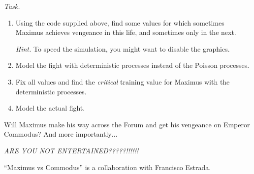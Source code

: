 \hfill

\emph{Task. } 
\begin{enumerate}[label=\emph{\arabic*.}]
	\item Using the code supplied above, find some values for which sometimes Maximus achieves vengeance in this life, and sometimes only in the next.
	
	\emph{Hint.} To speed the simulation, you might want to disable the graphics.
	\item Model the fight with deterministic processes instead of the Poisson processes.
	\item Fix all values and find the \emph{critical} training value for Maximus with the deterministic processes.
	\item Model the actual fight.
\end{enumerate}











\vfill

Will Maximus make his way across the Forum and get his vengeance on Emperor Commodus? And more importantly$\ldots$

\begin{center}
\emph{ARE YOU NOT ENTERTAINED?????!!!!!!	}
\end{center}

%
%


\vfill

\hfill ``Maximus vs Commodus'' is a collaboration with Francisco Estrada.

\begin{noexercises}
\end{noexercises}
